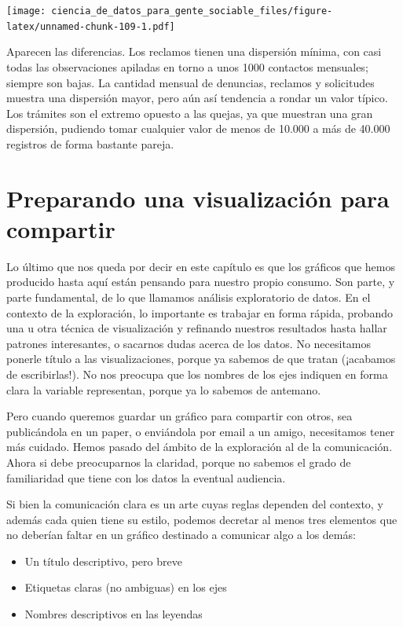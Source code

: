 \documentclass[spanish,]{book}
\providecommand{\tightlist}{%
  \setlength{\itemsep}{0pt}\setlength{\parskip}{0pt}}
\begin{document}
\texttt{[image: ciencia\_de\_datos\_para\_gente\_sociable\_files/figure-latex/unnamed-chunk-109-1.pdf]}

Aparecen las diferencias. Los reclamos tienen una dispersión mínima, con casi todas las observaciones apiladas en torno a unos 1000 contactos mensuales; siempre son bajas. La cantidad mensual de denuncias, reclamos y solicitudes muestra una dispersión mayor, pero aún así tendencia a rondar un valor típico. Los trámites son el extremo opuesto a las quejas, ya que muestran una gran dispersión, pudiendo tomar cualquier valor de menos de 10.000 a más de 40.000 registros de forma bastante pareja.

\hypertarget{preparando-una-visualizaciuxf3n-para-compartir}{%
\section{Preparando una visualización para compartir}\label{preparando-una-visualizaciuxf3n-para-compartir}}

Lo último que nos queda por decir en este capítulo es que los gráficos que hemos producido hasta aquí están pensando para nuestro propio consumo. Son parte, y parte fundamental, de lo que llamamos análisis exploratorio de datos. En el contexto de la exploración, lo importante es trabajar en forma rápida, probando una u otra técnica de visualización y refinando nuestros resultados hasta hallar patrones interesantes, o sacarnos dudas acerca de los datos. No necesitamos ponerle título a las visualizaciones, porque ya sabemos de que tratan (¡acabamos de escribirlas!). No nos preocupa que los nombres de los ejes indiquen en forma clara la variable representan, porque ya lo sabemos de antemano.

Pero cuando queremos guardar un gráfico para compartir con otros, sea publicándola en un paper, o enviándola por email a un amigo, necesitamos tener más cuidado. Hemos pasado del ámbito de la exploración al de la comunicación. Ahora si debe preocuparnos la claridad, porque no sabemos el grado de familiaridad que tiene con los datos la eventual audiencia.

Si bien la comunicación clara es un arte cuyas reglas dependen del contexto, y además cada quien tiene su estilo, podemos decretar al menos tres elementos que no deberían faltar en un gráfico destinado a comunicar algo a los demás:

\begin{itemize}
\tightlist
\item
  Un título descriptivo, pero breve
\item
  Etiquetas claras (no ambiguas) en los ejes
\item
  Nombres descriptivos en las leyendas
\end{itemize}
\end{document}
